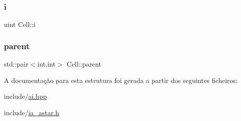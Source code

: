 \mbox{\label{structCell_ae36083edff27d1258eb42d6dadd97a0c}} 
\subsubsection{\texorpdfstring{i}{i}}
{\footnotesize\ttfamily uint Cell\+::i}

\mbox{\label{structCell_a0e60e7ac46f80dc1046963d7a0484288}} 
\subsubsection{\texorpdfstring{parent}{parent}}
{\footnotesize\ttfamily std\+::pair$<$int,int$>$ Cell\+::parent}



A documentação para esta estrutura foi gerada a partir dos seguintes ficheiros\+:\begin{DoxyCompactItemize}
\item 
include/\hyperlink{ai_8hpp}{ai.\+hpp}\item 
include/\hyperlink{ia__astar_8h}{ia\+\_\+astar.\+h}\end{DoxyCompactItemize}
